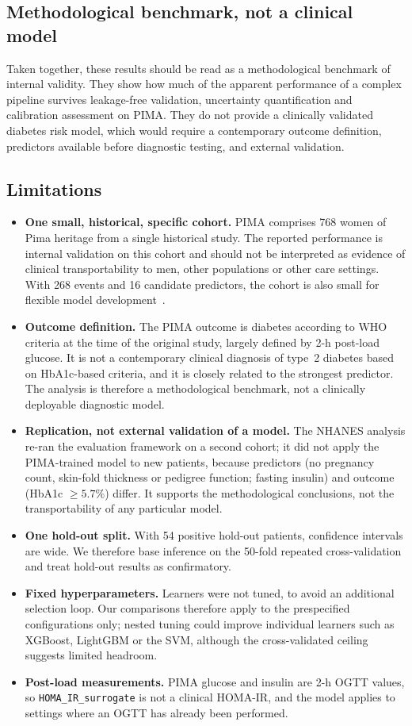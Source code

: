 \subsection{Methodological benchmark, not a clinical model}
Taken together, these results should be read as a methodological benchmark of internal validity. They show how much of the apparent performance of a complex pipeline survives leakage-free validation, uncertainty quantification and calibration assessment on PIMA. They do not provide a clinically validated diabetes risk model, which would require a contemporary outcome definition, predictors available before diagnostic testing, and external validation.

\subsection{Limitations}
\begin{itemize}
  \item \textbf{One small, historical, specific cohort.} PIMA comprises 768 women of Pima heritage from a single historical study. The reported performance is internal validation on this cohort and should not be interpreted as evidence of clinical transportability to men, other populations or other care settings. With 268 events and 16 candidate predictors, the cohort is also small for flexible model development~\cite{riley2020samplesize}.
  \item \textbf{Outcome definition.} The PIMA outcome is diabetes according to WHO criteria at the time of the original study, largely defined by 2-h post-load glucose. It is not a contemporary clinical diagnosis of type~2 diabetes based on HbA1c-based criteria, and it is closely related to the strongest predictor. The analysis is therefore a methodological benchmark, not a clinically deployable diagnostic model.
  \item \textbf{Replication, not external validation of a model.} The NHANES analysis re-ran the evaluation framework on a second cohort; it did not apply the PIMA-trained model to new patients, because predictors (no pregnancy count, skin-fold thickness or pedigree function; fasting insulin) and outcome (HbA1c $\geq 5.7\%$) differ. It supports the methodological conclusions, not the transportability of any particular model.
  \item \textbf{One hold-out split.} With 54 positive hold-out patients, confidence intervals are wide. We therefore base inference on the 50-fold repeated cross-validation and treat hold-out results as confirmatory.
  \item \textbf{Fixed hyperparameters.} Learners were not tuned, to avoid an additional selection loop. Our comparisons therefore apply to the prespecified configurations only; nested tuning could improve individual learners such as XGBoost, LightGBM or the SVM, although the cross-validated ceiling suggests limited headroom.
  \item \textbf{Post-load measurements.} PIMA glucose and insulin are 2-h OGTT values, so \texttt{HOMA\_IR\_surrogate} is not a clinical HOMA-IR, and the model applies to settings where an OGTT has already been performed.
\end{itemize}

